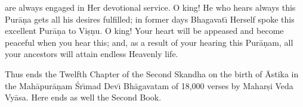 are always engaged in Her devotional service. O king! He who hears always this Pur\=a\d{n}a gets all his desires fulfilled; in former days Bhagavat\={\i} Herself spoke this excellent Pur\=a\d{n}a to Vi\d{s}\d{n}u. O king! Your heart will be appeased and become peaceful when you hear this; and, as a result of your hearing this Pur\=a\d{n}am, all your ancestors will attain endless Heavenly life.

Thus ends the Twelfth Chapter of the Second Skandha on the birth of \=Astika in the Mah\=apur\=a\d{n}am \'Sr\={\i}mad Dev\={\i} Bh\=agavatam of 18,000 verses by Mahar\d{s}i Veda Vy\=asa. Here ends as well the Second Book.



